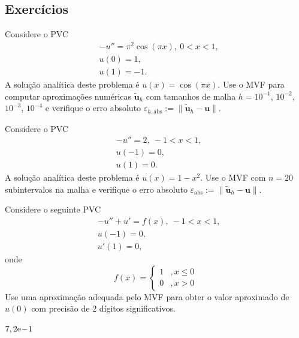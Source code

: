 \subsection{Exercícios}

\begin{exer}
  Considere o PVC
  \begin{align}
    &-u'' = \pi^2\cos(\pi x), ~0 < x < 1,\\
    &u(0) = 1,\\
    &u(1) = -1.
  \end{align}
  A solução analítica deste problema é $u(x) = \cos(\pi x)$. Use o MVF para computar aproximações numéricas $\tilde{\pmb{u}}_h$ com tamanhos de malha $h = 10^{-1}$, $10^{-2}$, $10^{-3}$, $10^{-4}$ e verifique o erro absoluto $\varepsilon_{h,\text{abs}} := \|\tilde{\pmb{u}}_h - \pmb{u}\|$.
\end{exer}

\begin{exer}
  Considere o PVC
  \begin{align}
    &-u'' = 2, ~-1 < x < 1,\\
    &u(-1) = 0,\\
    &u(1) = 0.
  \end{align}
  A solução analítica deste problema é $u(x) = 1-x^2$. Use o MVF com $n=20$ subintervalos na malha e verifique o erro absoluto $\varepsilon_{\text{abs}} := \|\tilde{\pmb{u}}_h - \pmb{u}\|$.
\end{exer}

\begin{exer}
Considere o seguinte PVC
\begin{subequations}
  \begin{align}
    &-u'' + u' = f(x), ~-1 < x < 1,\\
    &u(-1) = 0,\\
    &u'(1) =0,
  \end{align}
\end{subequations}
onde
\begin{equation}
  f(x) = \left\{
    \begin{array}{ll}
      1 &, x\leq 0\\
      0 &, x>0
    \end{array}
  \right.
\end{equation}
Use uma aproximação adequada pelo MVF para obter o valor aproximado de $u(0)$ com precisão de $2$ dígitos significativos.
\end{exer}
\begin{resp}
  $7,2\mathrm{e}\!-\!1$
\end{resp}

